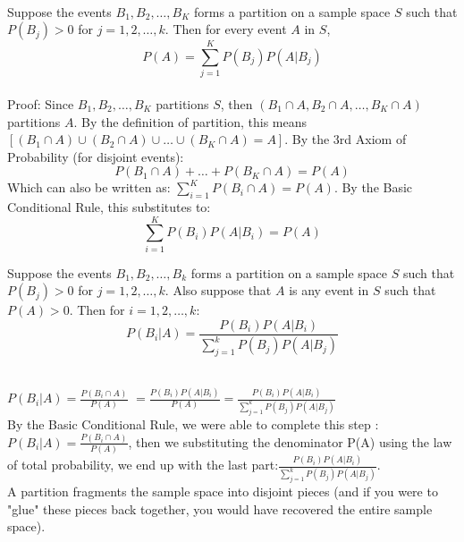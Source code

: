 \documentclass[12pt]{article}
\begin{document}

\begin{enumerate}


\\
Suppose the events $B_1, B_2, \dots, B_K$ forms a partition on a sample space $S$ such that $P(B_j) > 0$ for $j=1,2,\dots,k$. Then for every event $A$ in $S$, $$P(A)=\sum_{j=1}^{K}P(B_j)P(A|B_j)$$
\\
Proof: Since $B_1, B_2, \dots, B_K$ partitions $S$, then $(B_1 \cap A, B_2 \cap A, \dots, B_K \cap A)$ partitions $A$. By the definition of partition, this means $[(B_1 \cap A) \cup (B_2 \cap A) \cup \dots \cup (B_K \cap A) = A]$. By the 3rd Axiom of Probability (for disjoint events): $$P(B_1 \cap A) + \dots + P(B_K \cap A) = P(A)$$Which can also be written as: $\sum_{i=1}^{K}P(B_i \cap A) = P(A)$. By the Basic Conditional Rule, this substitutes to: $$\sum_{i=1}^{K}P(B_i)P(A|B_i) = P(A)$$



Suppose the events $B_1, B_2, \dots, B_k$ forms a partition on a sample space $S$ such that $P(B_j) > 0$ for $j=1,2,\dots,k$. Also suppose that $A$ is any event in $S$ such that $P(A) > 0$. Then for $i=1,2,\dots,k$: $$P(B_i|A) = \frac{P(B_i)P(A|B_i)}{\sum_{j=1}^{k}P(B_j)P(A|B_j)}$$

\\
$P(B_i|A) = \frac{P(B_i \cap A)}{P(A)}$
$= \frac{P(B_i)P(A|B_i)}{P(A)}$$= \frac{P(B_i)P(A|B_i)}{\sum_{j=1}^{k}P(B_j)P(A|B_j)}$ 
\\By the Basic Conditional Rule, we were able to complete this step :$P(B_i|A) = \frac{P(B_i \cap A)}{P(A)}$, then we substituting the denominator P(A) using the law of total probability, we end up with the last part:$ \frac{P(B_i)P(A|B_i)}{\sum_{j=1}^{k}P(B_j)P(A|B_j)}$.
\\
A partition fragments the sample space into disjoint pieces (and if you were to "glue" these pieces back together, you would have recovered the entire sample space).

\end{enumerate}

\end{document}
